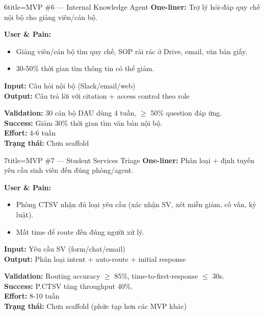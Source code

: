 \documentclass[11pt,a4paper]{article}
\begin{document}
\begin{mvpbox}{6}{title=MVP \#6 — Internal Knowledge Agent}
\textbf{One-liner:} Trợ lý hỏi-đáp quy chế nội bộ cho giảng viên/cán bộ.

\textbf{User \& Pain:}
\begin{itemize}
\item Giảng viên/cán bộ tìm quy chế, SOP rải rác ở Drive, email, văn bản giấy.
\item 30-50\% thời gian tìm thông tin có thể giảm.
\end{itemize}

\textbf{Input:} Câu hỏi nội bộ (Slack/email/web)\\
\textbf{Output:} Câu trả lời với citation + access control theo role

\textbf{Validation:} 30 cán bộ DAU dùng 4 tuần, $\geq$ 50\% question đáp ứng.\\
\textbf{Success:} Giảm 30\% thời gian tìm văn bản nội bộ.\\
\textbf{Effort:} 4-6 tuần\\
\textbf{Trạng thái:} Chưa scaffold
\end{mvpbox}

\begin{mvpbox}{7}{title=MVP \#7 — Student Services Triage}
\textbf{One-liner:} Phân loại + định tuyến yêu cầu sinh viên đến đúng phòng/agent.

\textbf{User \& Pain:}
\begin{itemize}
\item Phòng CTSV nhận đủ loại yêu cầu (xác nhận SV, xét miễn giảm, cố vấn, kỷ luật).
\item Mất time để route đến đúng người xử lý.
\end{itemize}

\textbf{Input:} Yêu cầu SV (form/chat/email)\\
\textbf{Output:} Phân loại intent + auto-route + initial response

\textbf{Validation:} Routing accuracy $\geq$ 85\%, time-to-first-response $\leq$ 30s.\\
\textbf{Success:} P.CTSV tăng throughput 40\%.\\
\textbf{Effort:} 8-10 tuần\\
\textbf{Trạng thái:} Chưa scaffold (phức tạp hơn các MVP khác)
\end{mvpbox}
\end{document}

